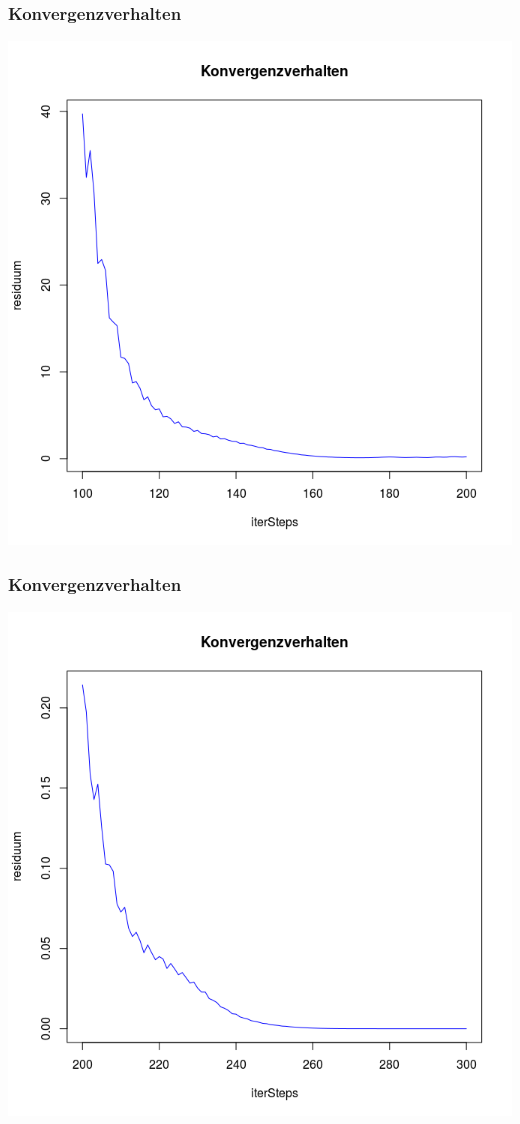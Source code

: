 \documentclass[]{beamer}
\begin{document}
\begin{frame}
\frametitle{Konvergenzverhalten}
\begin{center}
\includegraphics[scale=0.33]{Konvergenzverhalten_100_200.png}
\end{center}
\end{frame}

\begin{frame}
\frametitle{Konvergenzverhalten}
\begin{center}
\includegraphics[scale=0.33]{Konvergenzverhalten_200_300.png}
\end{center}
\end{frame}
\end{document}
